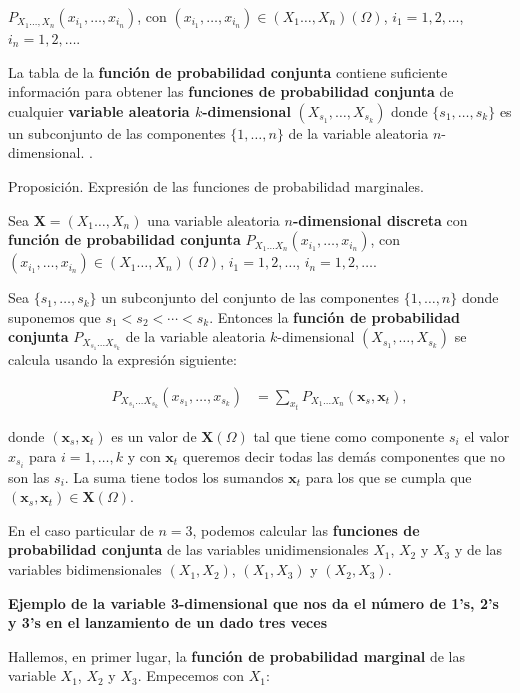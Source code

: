 \documentclass[]{book}
\begin{document}
\(P_{X_1\ldots,X_n}(x_{i_1},\ldots,x_{i_n})\), con \((x_{i_1},\ldots,x_{i_n})\in (X_1\ldots,X_n)(\Omega)\), \(i_1=1,2,\ldots\), \(i_n=1,2,\ldots\).

La tabla de la \textbf{función de probabilidad conjunta} contiene suficiente información para obtener las \textbf{funciones de probabilidad conjunta} de cualquier \textbf{variable aleatoria \(k\)-dimensional} \((X_{s_1},\ldots,X_{s_k})\) donde \(\{s_1,\ldots,s_k\}\) es un subconjunto de las componentes \(\{1,\ldots,n\}\) de la variable aleatoria \(n\)-dimensional. .

Proposición. Expresión de las funciones de probabilidad marginales.

Sea \(\mathbf{X}=(X_1\ldots,X_n)\) una variable aleatoria \textbf{\(n\)-dimensional discreta} con \textbf{función de probabilidad conjunta} \(P_{X_1\ldots X_n}(x_{i_1},\ldots,x_{i_n})\), con \((x_{i_1},\ldots,x_{i_n})\in (X_1\ldots,X_n)(\Omega)\), \(i_1=1,2,\ldots\), \(i_n=1,2,\ldots\).

Sea \(\{s_1,\ldots,s_k\}\) un subconjunto del conjunto de las componentes \(\{1,\ldots,n\}\) donde suponemos que \(s_1 < s_2<\cdots < s_k\). Entonces la \textbf{función de probabilidad conjunta} \(P_{X_{s_1}\ldots X_{s_k}}\) de la variable aleatoria \(k\)-dimensional \((X_{s_1},\ldots, X_{s_k})\) se calcula usando la expresión siguiente:

\[
\begin{array}{rl}
P_{X_{s_1}\ldots X_{s_k}}(x_{s_1},\ldots,x_{s_k})  & = \sum_{x_t} P_{X_1\ldots X_n}(\mathbf{x}_s,\mathbf{x}_t),
\end{array}
\]

donde \((\mathbf{x}_s,\mathbf{x}_t)\) es un valor de \(\mathbf{X}(\Omega)\) tal que tiene como componente \(s_i\) el valor \(x_{s_i}\) para \(i=1,\ldots, k\) y con \(\mathbf{x}_t\) queremos decir todas las demás componentes que no son las \(s_i\). La suma tiene todos los sumandos \(\mathbf{x}_t\) para los que se cumpla que \((\mathbf{x}_s,\mathbf{x}_t)\in \mathbf{X}(\Omega)\).

En el caso particular de \(n=3\), podemos calcular las \textbf{funciones de probabilidad conjunta} de las variables unidimensionales \(X_1\), \(X_2\) y \(X_3\) y de las variables bidimensionales \((X_1,X_2)\), \((X_1,X_3)\) y \((X_2,X_3)\).

\textbf{Ejemplo de la variable 3-dimensional que nos da el número de 1's, 2's y 3's en el lanzamiento de un dado tres veces}

Hallemos, en primer lugar, la \textbf{función de probabilidad marginal} de las variable \(X_1\), \(X_2\) y \(X_3\). Empecemos con \(X_1\):
\end{document}
